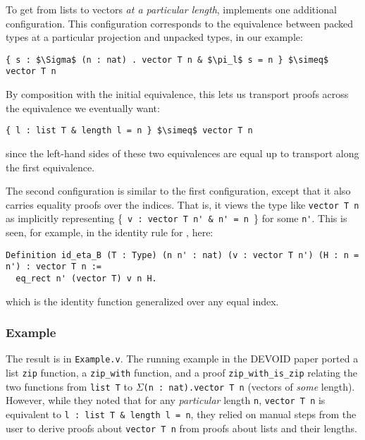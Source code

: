To get from lists to vectors \textit{at a particular length}, \toolname implements one additional configuration.
This configuration corresponds to the equivalence between packed types at a particular projection
and unpacked types, in our example:

\begin{lstlisting}
{ s : $\Sigma$ (n : nat) . vector T n & $\pi_l$ s = n } $\simeq$ vector T n
\end{lstlisting}
By composition with the initial equivalence, this lets us transport proofs
across the equivalence we eventually want:

\begin{lstlisting}
{ l : list T & length l = n } $\simeq$ vector T n
\end{lstlisting}
since the left-hand sides of these two equivalences are equal up to transport along the first equivalence.

The second configuration is similar to the first configuration, except that it also carries equality proofs over the indices.
That is, it views the type \B like \lstinline{vector T n} as implicitly representing \{\lstinline{ v : vector T n' & n' = n }\} for some \lstinline{n'}.
This is seen, for example, in the identity rule for \B, here: 

\begin{lstlisting}
Definition id_eta_B (T : Type) (n n' : nat) (v : vector T n') (H : n = n') : vector T n :=
  eq_rect n' (vector T) v n H.
\end{lstlisting}
which is the identity function generalized over any equal index.

\subsubsection{Example}

The result is in \lstinline{Example.v}. 
The running example in the DEVOID paper ported a list \lstinline{zip} function,
a \lstinline{zip_with} function, and a proof \lstinline{zip_with_is_zip} relating the two
functions from \lstinline{list T} to $\Sigma$\lstinline{(n : nat).vector T n} (vectors of
\textit{some} length).
However, while they noted that for any \textit{particular} length \lstinline{n}, \lstinline{vector T n} is equivalent to
\lstinline{l : list T & length l = n}, they relied on manual steps from the user to derive proofs about \lstinline{vector T n}
from proofs about lists and their lengths.

